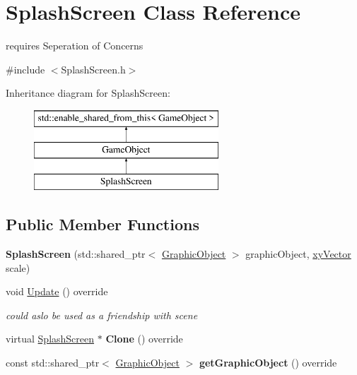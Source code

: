 \hypertarget{class_splash_screen}{}\section{Splash\+Screen Class Reference}
\label{class_splash_screen}


requires Seperation of Concerns  




{\ttfamily \#include $<$Splash\+Screen.\+h$>$}

Inheritance diagram for Splash\+Screen\+:\begin{figure}[H]
\begin{center}
\leavevmode
\includegraphics[height=3.000000cm]{da/d1c/class_splash_screen}
\end{center}
\end{figure}
\subsection*{Public Member Functions}
\begin{DoxyCompactItemize}
\item 
\mbox{\label{class_splash_screen_aff0a7efdddd95c010d4983515ccb7d69}} 
{\bfseries Splash\+Screen} (std\+::shared\+\_\+ptr$<$ \hyperlink{class_graphic_object}{Graphic\+Object} $>$ graphic\+Object, \hyperlink{structxy_vector}{xy\+Vector} scale)
\item 
\mbox{\label{class_splash_screen_af78b8eab226a89fec389e53cbf3ed9e8}} 
void \hyperlink{class_splash_screen_af78b8eab226a89fec389e53cbf3ed9e8}{Update} () override
\begin{DoxyCompactList}\small\item\em could aslo be used as a friendship with scene \end{DoxyCompactList}\item 
\mbox{\label{class_splash_screen_ade64be3c5beadcf67968758e0579fa58}} 
virtual \hyperlink{class_splash_screen}{Splash\+Screen} $\ast$ {\bfseries Clone} () override
\item 
\mbox{\label{class_splash_screen_a3ec49990d3882d7f1c17cdfd37a4c133}} 
const std\+::shared\+\_\+ptr$<$ \hyperlink{class_graphic_object}{Graphic\+Object} $>$ {\bfseries get\+Graphic\+Object} () override
\end{DoxyCompactItemize}
